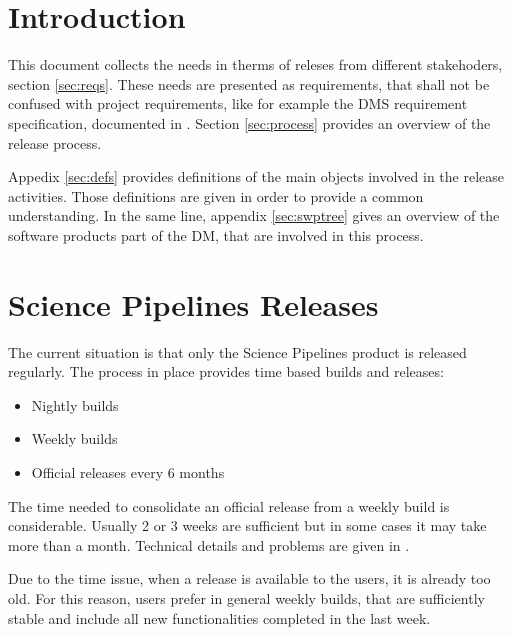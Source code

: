\section{Introduction} \label{sec:intro}

This document collects the needs in therms of releses from different stakehoders, section \ref{sec:reqs}.
These needs are presented as requirements, that shall not be confused with project requirements, like for example the \gls{DMS} requirement specification, documented in .
Section \ref{sec:process} provides an overview of the release process.

Appedix \ref{sec:defs} provides definitions of the main objects involved in the release activities. 
Those definitions are given in order to provide a common understanding.
In the same line, appendix \ref{sec:swptree} gives an overview of the software products part of the \gls{DM}, that are involved in this process.


\newpage
\section{Science Pipelines Releases}\label{sec:sci}

The current situation is that only the Science Pipelines product is released regularly.
The process in place provides time based builds and releases:

\begin{itemize}
\item Nightly builds
\item Weekly builds
\item Official releases every 6 months
\end{itemize}

The time needed to consolidate an official release from a weekly build is considerable.
Usually 2 or 3 weeks are sufficient but in some cases it may take more than a month. 
Technical details and problems are given in .

Due to the time issue, when a release is available to the users, it is already too old.
For this reason, users prefer in general weekly builds, that are sufficiently stable and include all new functionalities completed in the last week.


